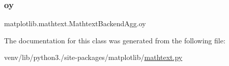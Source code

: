 \mbox{\label{classmatplotlib_1_1mathtext_1_1MathtextBackendAgg_af9d59fb4517c64445577482addb56ba9}} 
\subsubsection{\texorpdfstring{oy}{oy}}
{\footnotesize\ttfamily matplotlib.\+mathtext.\+Mathtext\+Backend\+Agg.\+oy}



The documentation for this class was generated from the following file\+:\begin{DoxyCompactItemize}
\item 
venv/lib/python3./site-\/packages/matplotlib/\hyperlink{mathtext_8py}{mathtext.\+py}\end{DoxyCompactItemize}
